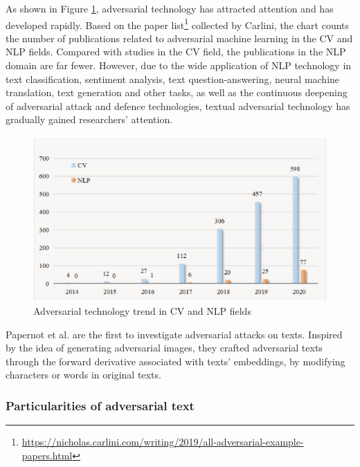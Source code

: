 As shown in Figure \ref{fig:2_2_adversarial_trend}, adversarial technology has attracted attention and has developed rapidly. Based on the paper list\footnote{\url{https://nicholas.carlini.com/writing/2019/all-adversarial-example-papers.html}} collected by Carlini, the chart counts
the number of publications related to adversarial machine learning in the CV and NLP fields. Compared with studies in the CV field, the publications in the NLP domain are far fewer. However, due to the wide application of NLP technology in text classification, sentiment analysis, text question-answering, neural machine translation, text generation and other tasks, as well as the continuous deepening of adversarial attack and defence technologies, textual adversarial technology has gradually gained researchers' attention.

\begin{figure}
    \centering
    \includegraphics[width=0.8\linewidth]{images/2_2_papers.png}
    \caption{Adversarial technology trend in CV and NLP fields \cite{QIU2022278}}
    \label{fig:2_2_adversarial_trend}
\end{figure}

Papernot et al. \cite{journals/corr/PapernotMSH16} are the first to investigate adversarial attacks
on texts. Inspired by the idea of generating adversarial images, they crafted adversarial texts through the forward derivative associated with texts' embeddings, by modifying characters or words in original texts.


\subsubsection{Particularities of adversarial text}\label{subsubsec:particularities-of-adversarial-text}

